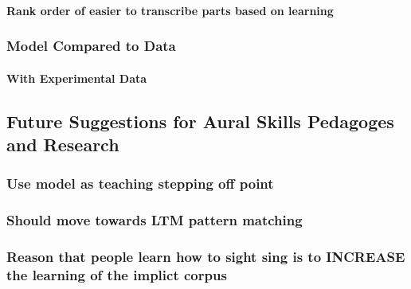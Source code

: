 \documentclass[]{book}
\let\oldparagraph\paragraph
\renewcommand{\paragraph}[1]{\oldparagraph{#1}\mbox{}}
\theoremstyle{definition}
\theoremstyle{definition}
\theoremstyle{definition}
\theoremstyle{remark}
\begin{document}
\hypertarget{rank-order-of-easier-to-transcribe-parts-based-on-learning}{%
\paragraph{Rank order of easier to transcribe parts based on
learning}\label{rank-order-of-easier-to-transcribe-parts-based-on-learning}}

\hypertarget{model-compared-to-data}{%
\subsubsection{Model Compared to Data}\label{model-compared-to-data}}

\hypertarget{with-experimental-data}{%
\paragraph{With Experimental Data}\label{with-experimental-data}}

\hypertarget{future-suggestions-for-aural-skills-pedagoges-and-research}{%
\subsection{Future Suggestions for Aural Skills Pedagoges and
Research}\label{future-suggestions-for-aural-skills-pedagoges-and-research}}

\hypertarget{use-model-as-teaching-stepping-off-point}{%
\subsubsection{Use model as teaching stepping off
point}\label{use-model-as-teaching-stepping-off-point}}

\hypertarget{should-move-towards-ltm-pattern-matching}{%
\subsubsection{Should move towards LTM pattern
matching}\label{should-move-towards-ltm-pattern-matching}}

\hypertarget{reason-that-people-learn-how-to-sight-sing-is-to-increase-the-learning-of-the-implict-corpus}{%
\subsubsection{Reason that people learn how to sight sing is to INCREASE
the learning of the implict
corpus}\label{reason-that-people-learn-how-to-sight-sing-is-to-increase-the-learning-of-the-implict-corpus}}
\end{document}
